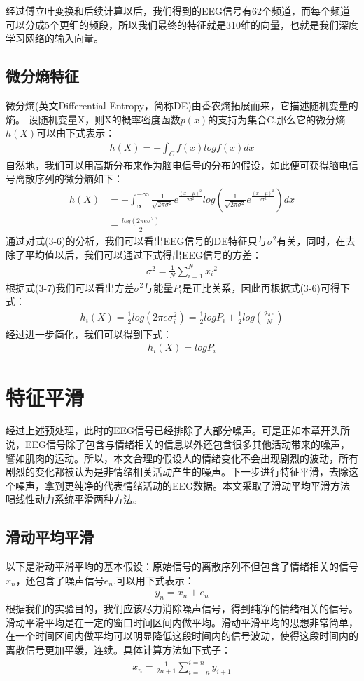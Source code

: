 	经过傅立叶变换和后续计算以后，我们得到的EEG信号有62个频道，而每个频道可以分成5个更细的频段，所以我们最终的特征就是310维的向量，也就是我们深度学习网络的输入向量。
	\subsection{微分熵特征}
	微分熵(英文Differential Entropy，简称DE)由香农熵拓展而来，它描述随机变量的熵。
	设随机变量X，则X的概率密度函数$p(x)$的支持为集合C.那么它的微分熵$h(X)$可以由下式表示：
	\begin{align}
	h(X) = -\int_C f(x)logf(x)dx
	\end{align}
	自然地，我们可以用高斯分布来作为脑电信号的分布的假设，如此便可获得脑电信号离散序列的微分熵如下：
	\begin{align}
	h(X) &=  -\int_{\infty}^{-\infty} {\frac{1}{\sqrt{2\pi \sigma^2}} e^{\frac{{(x-\mu)}^2}{2\sigma^2}}log(\frac{1}{\sqrt{2\pi \sigma^2}}e^{\frac{{(x-\mu)}^2}{2\sigma^2}})dx} \\
	&=\frac{log(2\pi e \sigma^2)}{2}
	\end{align}
	通过对式(3-6)的分析，我们可以看出EEG信号的DE特征只与$\sigma^2$有关，同时，在去除了平均值以后，我们可以通过下式得出EEG信号的方差：
	\begin{align}
	\sigma^2 = \frac{1}{N} \sum_{i=1}^{N}{{x_i}^2}
	\end{align}
	根据式(3-7)我们可以看出方差$\sigma^2$与能量$P_i$是正比关系，因此再根据式(3-6)可得下式：
	\begin{align}
	h_i(X) = \frac{1}{2}log(2\pi e \sigma_i^2) = \frac{1}{2}log P_i + \frac{1}{2}log(\frac{2\pi e}{N})
	\end{align}
	经过进一步简化，我们可以得到下式：\\
	\begin{align}
	h_i(X) = log P_i
	\end{align}
	
	\section{特征平滑}
	经过上述预处理，此时的EEG信号已经排除了大部分噪声。可是正如本章开头所说，EEG信号除了包含与情绪相关的信息以外还包含很多其他活动带来的噪声，譬如肌肉的运动。所以，本文合理的假设人的情绪变化不会出现剧烈的波动，所有剧烈的变化都被认为是非情绪相关活动产生的噪声。下一步进行特征平滑，去除这个噪声，拿到更纯净的代表情绪活动的EEG数据。本文采取了滑动平均平滑方法喝线性动力系统平滑两种方法。
	\subsection{滑动平均平滑}
	以下是滑动平滑平均的基本假设：原始信号的离散序列不但包含了情绪相关的信号$x_n$，还包含了噪声信号$e_n$,可以用下式表示：
	\begin{align}
	y_n = x_n + e_n
	\end{align}
	根据我们的实验目的，我们应该尽力消除噪声信号，得到纯净的情绪相关的信号。滑动平滑平均是在一定的窗口时间区间内做平均。滑动平滑平均的思想非常简单，在一个时间区间内做平均可以明显降低这段时间内的信号波动，使得这段时间内的离散信号更加平缓，连续。具体计算方法如下式子：
	\begin{align}
	x_n = \frac{1}{2n + 1} \sum_{i=-n}^{i=n}y_{i+1}
	\end{align}
	
